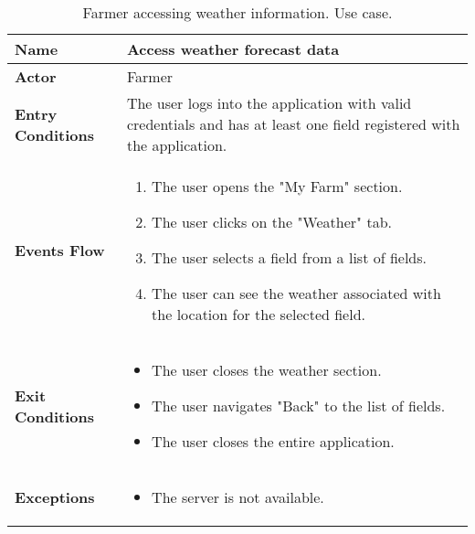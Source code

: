 \begin{table}[hbt!]
\centering
\small
\caption{\label{tab:farmerWeather}Farmer accessing weather information. Use case.}
\renewcommand{\arraystretch}{1.25}
\begin{tabular}{|l|>{\raggedright\arraybackslash}m{12cm}|}
    \hline
    \textbf{Name} & Access weather forecast data\\
    \hline
   	\textbf{Actor} & Farmer\\
    \hline
    \textbf{Entry Conditions} & The user logs into the application with valid credentials and has at least one field registered with the application.\\
    \hline
    
    \textbf{Events Flow} & \begin{enumerate}
    			\item The user opens the "My Farm" section.
    			\item The user clicks on the "Weather" tab.
    			\item The user selects a field from a list of fields.
    			\item The user can see the weather associated with the location for the selected field.
	    		\end{enumerate}
    	\\
    \hline
    \textbf{Exit Conditions} & \begin{itemize}
    	\item The user closes the weather section.
    	\item The user navigates "Back" to the list of fields.
   		\item The user closes the entire application.
   		\end{itemize} \\
    \hline
    \textbf{Exceptions} &
    		\begin{itemize}
    			\item The server is not available.
    		\end{itemize}
    \\
    \hline
\end{tabular}
\end{table}